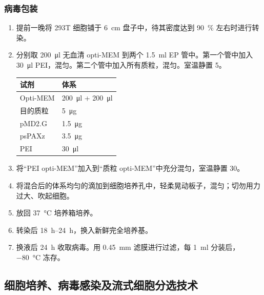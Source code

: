\subsubsection{病毒包装}
\begin{enumerate}
    \item 提前一晚将 293T 细胞铺于 \qty{6}{\cm} 盘子中，待其密度达到 \qty{90}{\percent} 左右时进行转染。
    \item 分别取 \qty{200}{\ul} 无血清 opti-MEM 到两个 \qty{1.5}{\ml} EP 管中。第一个管中加入 \qty{30}{\ul} PEI，混匀。第二个管中加入所有质粒，混匀。室温静置 \qty{5}{\min}。

    \begin{table}[H]
        \centering
        \begin{tabular}{C{5cm} C{5cm}}
            \toprule
            \textbf{试剂} & \textbf{体系} \\
            \midrule
            Opti-MEM        & \qty{200}{\ul} + \qty{200}{\ul} \\
            目的质粒         & \qty{5}{\ug} \\
            pMD2.G          & \qty{1.5}{\ug} \\
            psPAXz          & \qty{3.5}{\ug} \\
            PEI             & \qty{30}{\ul} \\
            \bottomrule
        \end{tabular}
    \end{table}

    \item 将``PEI opti-MEM''加入到``质粒 opti-MEM''中充分混匀，室温静置 \qty{30}{\min}。
    \item 将混合后的体系均匀的滴加到细胞培养孔中，轻柔晃动板子，混匀；切勿用力过大、吹起细胞。
    \item 放回 \qty{37}{\celsius} 培养箱培养。
    \item 转染后 \qtyrange{18}{24}{\hour}，换入新鲜完全培养基。
    \item 换液后 \qty{24}{\hour} 收取病毒。用 \qty{0.45}{\mm} 滤膜进行过滤，每 \qty{1}{\ml} 分装后，\qty{-80}{\celsius} 冻存。
\end{enumerate}

\subsection{细胞培养、病毒感染及流式细胞分选技术}
